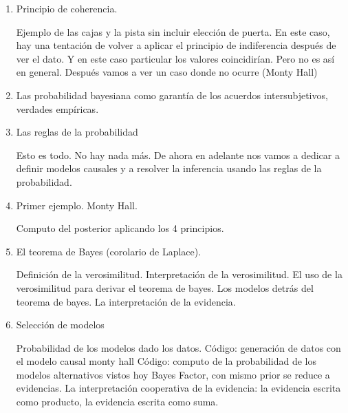 \documentclass[10pt]{article}
\begin{document}
\begin{enumerate}
\begin{enumerate}
\item Principio de coherencia.

Ejemplo de las cajas y la pista sin incluir elección de puerta. En este caso, hay una tentación de volver a aplicar el principio de indiferencia después de ver el dato. Y en este caso particular los valores coincidirían. Pero no es así en general. Después vamos a ver un caso donde no ocurre (Monty Hall) 

\item Las probabilidad bayesiana como garantía de los acuerdos intersubjetivos, verdades empíricas.

\item Las reglas de la probabilidad

Esto es todo. No hay nada más. De ahora en adelante nos vamos a dedicar a definir modelos causales y a resolver la inferencia usando las reglas de la probabilidad.

\item Primer ejemplo. Monty Hall.

Computo del posterior aplicando los 4 principios.

\item El teorema de Bayes (corolario de Laplace).

Definición de la verosimilitud.
Interpretación de la verosimilitud.
El uso de la verosimilitud para derivar el teorema de bayes.
Los modelos detrás del teorema de bayes.
La interpretación de la evidencia.

\item Selección de modelos

Probabilidad de los modelos dado los datos.
Código: generación de datos con el modelo causal monty hall
Código: computo de la probabilidad de los modelos alternativos vistos hoy
Bayes Factor, con mismo prior se reduce a evidencias.
La interpretación cooperativa de la evidencia: la evidencia escrita como producto, la evidencia escrita como suma.





\end{enumerate}



\end{enumerate}


{\scriptsize


}
\end{document}
